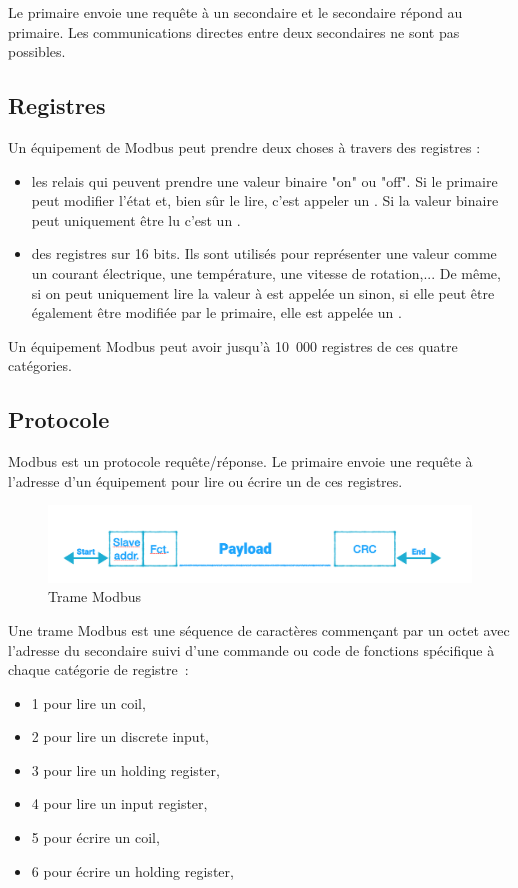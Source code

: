  Le primaire envoie une requête à un secondaire et le secondaire répond au primaire. Les communications directes entre deux secondaires ne sont pas possibles. 
 
 \subsection{Registres}
 
 
 Un équipement de Modbus peut prendre deux choses à travers des registres : 
 \begin{itemize}
     \item les relais qui peuvent prendre une valeur binaire "on" ou "off". Si le primaire peut modifier l'état et, bien sûr le lire, c'est appeler un \textit{}. Si la valeur binaire peut uniquement être lu c'est un \textit{}.
     \item des registres sur 16 bits. Ils sont utilisés pour représenter une valeur comme un courant électrique, une température, une vitesse de rotation,... De même, si on peut uniquement lire la valeur à est appelée un \textit{} sinon, si elle peut être également être modifiée par le primaire, elle est appelée un \textit{}.
 \end{itemize}
 
    \vspace{1em}

 
Un équipement Modbus peut avoir jusqu'à 10~000 registres de ces quatre catégories. 

\subsection{Protocole}

Modbus est un protocole requête/réponse. Le primaire envoie une requête à l'adresse d'un équipement pour lire ou écrire un de ces registres. 
\begin{figure}[tbp]
\centerline{\includegraphics[width=1\columnwidth]{Pictures/Capture37.png}}
\caption{Trame Modbus}
\label{fig-modbus2}
\end{figure}

 

Une trame Modbus est une séquence de caractères commençant par un octet avec l'adresse du secondaire suivi d'une commande ou code de fonctions spécifique à chaque catégorie de registre~:
\begin{itemize}
    \item 1 pour lire un coil,
    \item 2 pour lire un discrete input,
    \item 3 pour lire un holding register,
    \item 4 pour lire un input register,
    \item 5 pour écrire un coil,
    \item 6 pour écrire un holding register,
\end{itemize}

